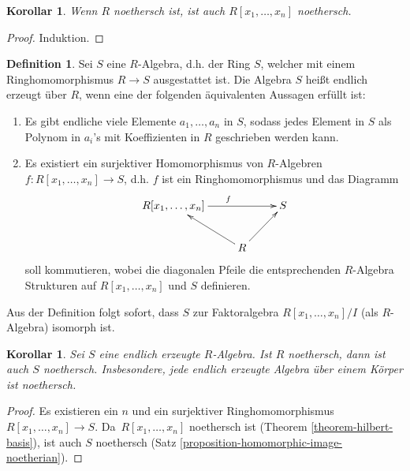 \documentclass[reqno,12pt]{article}
\numberwithin{equation}{section}
\theoremstyle{plain}
\newtheorem{cor}[thm]{Korollar}
\theoremstyle{definition}
\newtheorem{definition}[thm]{Definition}
\begin{document}
\begin{cor}
Wenn $R$ noethersch ist, ist auch $R[x_1, \dots, x_n]$ noethersch.
\end{cor}

\begin{proof}
Induktion.
\end{proof}

\begin{definition}
Sei $S$ eine $R$-Algebra, d.h. der Ring $S$, welcher mit einem Ringhomomorphismus $R \to S$ ausgestattet ist. Die Algebra $S$ heißt {\sf endlich erzeugt} über $R$, wenn eine der folgenden äquivalenten Aussagen erfüllt ist:
\begin{enumerate}
\item Es gibt endliche viele Elemente $a_1, \dots, a_n$ in $S$, sodass jedes Element in $S$ als Polynom in $a_i$'s mit Koeffizienten in $R$ geschrieben werden kann.

\item Es existiert ein surjektiver Homomorphismus von $R$-Algebren $f \colon R[x_1, \dots, x_n] \to S$, d.h. $f$ ist ein Ringhomomorphismus und das Diagramm
\begin{align*}
\xymatrix{
R[x_1, \dots, x_n] \ar[rr]^f && S \\
& \ar[ul] R \ar[ur]
}
\end{align*}
soll kommutieren, wobei die diagonalen Pfeile die entsprechenden $R$-Algebra Strukturen auf $R[x_1, \dots, x_n]$ und $S$ definieren.
\end{enumerate}

\noindent Aus der Definition folgt sofort, dass $S$ zur Faktoralgebra $R[x_1, \dots, x_n]/I$ (als $R$-Algebra) isomorph ist.

\end{definition}


\begin{cor}\label{corollary-finitely-generated-algebra-over-noetherian-ring-is-noetherian}
Sei $S$ eine endlich erzeugte $R$-Algebra. Ist $R$ noethersch, dann ist auch $S$ noethersch. Insbesondere, jede endlich erzeugte Algebra über einem Körper ist noethersch.
\end{cor}

\begin{proof}
Es existieren ein $n$ und ein surjektiver Ringhomomorphismus $R[x_1, \dots, x_n] \to S$. Da~$R[x_1, \dots, x_n]$ noethersch ist (Theorem \ref{theorem-hilbert-basis}), ist auch $S$ noethersch (Satz \ref{proposition-homomorphic-image-noetherian}).
\end{proof}
\end{document}
